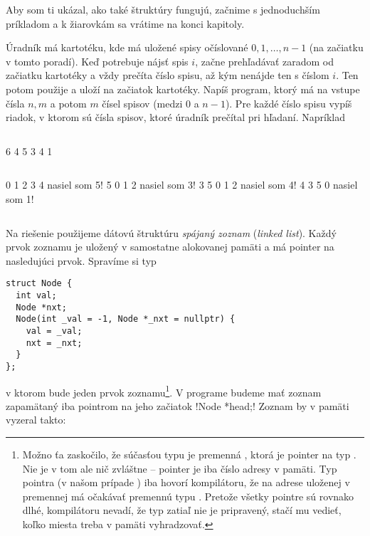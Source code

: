  Aby som ti ukázal, ako také štruktúry fungujú, začnime s jednoduchším príkladom
a k žiarovkám sa vrátime na konci kapitoly.

\begin{uloha}
  Úradník má kartotéku, kde má uložené spisy očíslované $0,1,\ldots,n-1$ (na začiatku
  v tomto poradí).
  Keď potrebuje nájsť spis $i$, začne prehľadávať zaradom od začiatku kartotéky
  a vždy prečíta číslo spisu, až kým nenájde ten s číslom $i$. Ten potom použije a 
  uloží na začiatok kartotéky. Napíš program, ktorý má na vstupe čísla $n, m$ a potom
  $m$ čísel spisov (medzi 0 a $n-1$). Pre každé číslo spisu vypíš riadok, v ktorom 
  sú čísla spisov, ktoré úradník prečítal pri hľadaní. Napríklad

  
  \begin{column}{0.45}
  \begin{outputBox}
6 4
5
3
4
1
\end{outputBox}
\end{column}
\begin{column}{0.45}
\begin{outputBox}
0 1 2 3 4 nasiel som 5!
5 0 1 2 nasiel som 3!
3 5 0 1 2 nasiel som 4!
4 3 5 0 nasiel som 1!

\end{outputBox}
\end{column}
\end{uloha}


Na riešenie použijeme dátovú štruktúru {\em spájaný zoznam} ({\em linked list}).
Každý prvok zoznamu je uložený v samostatne alokovanej pamäti a má pointer
na nasledujúci prvok. Spravíme si typ

\begin{lstlisting}
struct Node {
  int val;
  Node *nxt;
  Node(int _val = -1, Node *_nxt = nullptr) {
    val = _val;
    nxt = _nxt;
  }
};
\end{lstlisting}

v ktorom bude jeden prvok zoznamu\footnote{%
  Možno ťa zaskočilo, že súčasťou typu  je premenná , ktorá
  je pointer na typ . Nie je v tom ale nič zvláštne -- pointer je iba číslo
  adresy v pamäti. Typ pointra (v našom prípade ) iba hovorí kompilátoru,
  že na adrese uloženej v premennej  má očakávať premennú typu .
  Pretože všetky pointre sú rovnako dlhé, kompilátoru nevadí, že typ  zatiaľ nie 
  je pripravený, stačí mu vedieť, koľko miesta treba v pamäti vyhradzovať.
  }. V programe budeme mať zoznam zapamätaný iba pointrom
na jeho začiatok \prg!Node *head;! Zoznam \vb{[0 1 2 3 4 5]} by v pamäti vyzeral takto:\\
    

